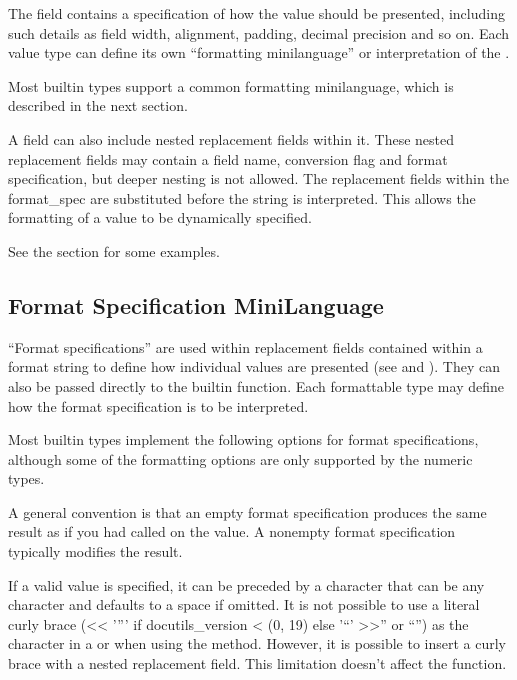 \documentclass[letterpaper,10pt,english]{sphinxmanual}
\begin{document}
The  field contains a specification of how the value should be
presented, including such details as field width, alignment, padding, decimal
precision and so on.  Each value type can define its own “formatting
mini\sphinxhyphen{}language” or interpretation of the .

Most built\sphinxhyphen{}in types support a common formatting mini\sphinxhyphen{}language, which is
described in the next section.

A  field can also include nested replacement fields within it.
These nested replacement fields may contain a field name, conversion flag
and format specification, but deeper nesting is
not allowed.  The replacement fields within the
format\_spec are substituted before the  string is interpreted.
This allows the formatting of a value to be dynamically specified.

See the {\hyperref[\detokenize{string:formatexamples}]{}} section for some examples.


\subsection{Format Specification Mini\sphinxhyphen{}Language}
\label{\detokenize{string:format-specification-mini-language}}\label{\detokenize{string:formatspec}}
“Format specifications” are used within replacement fields contained within a
format string to define how individual values are presented (see
{\hyperref[\detokenize{string:formatstrings}]{}} and ).
They can also be passed directly to the built\sphinxhyphen{}in
 function.  Each formattable type may define how the format
specification is to be interpreted.

Most built\sphinxhyphen{}in types implement the following options for format specifications,
although some of the formatting options are only supported by the numeric types.

A general convention is that an empty format specification produces
the same result as if you had called  on the value. A
non\sphinxhyphen{}empty format specification typically modifies the result.

If a valid  value is specified, it can be preceded by a 
character that can be any character and defaults to a space if omitted.
It is not possible to use a literal curly brace (<< '”' if docutils_version < (0, 19) else '“' >>\sphinxcode{\sphinxupquote{\{}}” or “\sphinxcode{\sphinxupquote{\}}}”) as
the  character in a  or when using the 
method.  However, it is possible to insert a curly brace
with a nested replacement field.  This limitation doesn’t
affect the  function.
\end{document}
